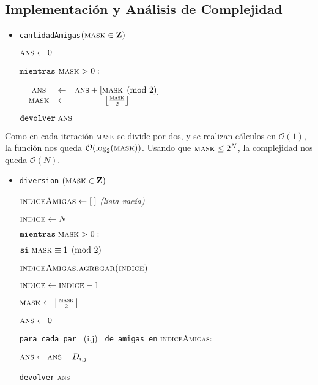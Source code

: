 \subsection{Implementación y Análisis de Complejidad}
\begin{itemize}
	\item \texttt{cantidadAmigas}$(\textsc{mask} \in \mathbf{Z})$
	
	$\textsc{ans} \leftarrow 0$
	
	$\texttt{mientras}$ $\textsc{mask} > 0:$

	$\begin{matrix}
	& \textsc{ans} & \leftarrow  & \textsc{ans} + \left [ \textsc{mask} \pmod{2}\right ] \\ 
	& \textsc{mask} & \leftarrow  & \left \lfloor \frac{\textsc{mask}}{2} \right \rfloor 
	\end{matrix}$
	
	$\texttt{devolver} \; \textsc{ans}$
\end{itemize}	
	Como en cada iteración \textsc{mask} se divide por dos, y se realizan cálculos en $\mathcal{O}(1)$, la función nos queda $\mathcal{O}(\text{log}_2(\textsc{mask}))$. Usando que $ \textsc{mask} \leq 2^N $, la complejidad nos queda $\mathcal{O}(N)$.
\begin{itemize}
	
	\item \texttt{diversion} $ (\textsc{mask} \in \mathbf{Z}) $
	
	$\textsc{indiceAmigas} \leftarrow [ \; ]$ \textit{(lista vacía)}
	
	$\textsc{indice} \leftarrow N$ 
	
	$\texttt{mientras} \; \textsc{mask} > 0:$
	
	\quad $ \texttt{si} \; \textsc{mask} \equiv 1 \pmod{2}$ 
	
	\quad \quad $ \textsc{indiceAmigas.agregar(indice)}$
	
	\quad $\textsc{indice} \leftarrow \textsc{indice} - 1$
	
	\quad $\textsc{mask} \leftarrow \left \lfloor \frac{\textsc{mask}}{2} \right \rfloor$ 
	
	$\textsc{ans} \leftarrow 0$
	
	\texttt{para cada par } (i,j) \texttt{ de amigas en} \textsc{indiceAmigas}:
	
	\quad $\textsc{ans} \leftarrow \textsc{ans} + D_{i,j}$
	
	\texttt{devolver} \textsc{ans}

\end{itemize}

